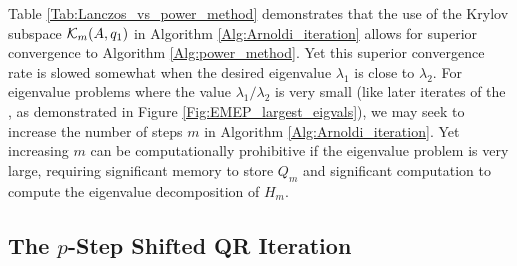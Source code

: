 Table \ref{Tab:Lanczos_vs_power_method} demonstrates that the use of the Krylov subspace ${\mathcal K}_m(A, 	q_1)$ in Algorithm \ref{Alg:Arnoldi_iteration} allows for superior convergence to Algorithm \ref{Alg:power_method}.  Yet this superior convergence rate is slowed somewhat when the desired eigenvalue $\lambda_1$ is close to $\lambda_2$.  For eigenvalue problems where the value $\lambda_1 / \lambda_2$ is very small (like later iterates of the \emep, as demonstrated in Figure \ref{Fig:EMEP_largest_eigvals}), we may seek to increase the number of steps $m$ in Algorithm \ref{Alg:Arnoldi_iteration}.  Yet increasing $m$ can be computationally prohibitive if the eigenvalue problem is very large, requiring significant memory to store $Q_m$ and significant computation to compute the eigenvalue decomposition of $H_m$.






\subsection{The $p$-Step Shifted QR Iteration} 			\label{Subsubsec:evol_mats-QR_iteration}


